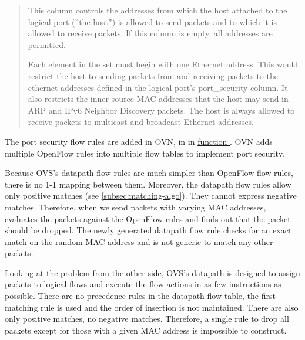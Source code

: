 \begin{quote}
    This column controls the addresses from which the host
    attached to the logical port (''the host'') is allowed to
    send packets and to which it is allowed to receive
    packets. If this column is empty, all addresses are
    permitted.

    Each element in the set must begin with one Ethernet
    address. This would restrict the host to sending packets
    from and receiving packets to the ethernet addresses
    defined in the logical port's port\_security column. It
    also restricts the inner source MAC addresses that the
    host may send in ARP and IPv6 Neighbor Discovery packets.
    The host is always allowed to receive packets to multicast
    and broadcast Ethernet addresses.
\end{quote}

The port security flow rules are added in OVN, in  in \href{https://github.com/ovn-org/ovn/blob/45bf9ed9dd2070a458bf384ce529e9ef62f26bd5/controller/lflow.c\#L3091-L3093}{function }. OVN adds multiple OpenFlow rules into multiple flow tables to implement port security.

Because OVS's datapath flow rules are much simpler than OpenFlow flow rules, there is no 1-1 mapping between them. Moreover, the datapath flow rules allow only positive matches (see \cref{subsec:matching-algo}). They cannot express negative matches. Therefore, when we send packets with varying MAC addresses,  evaluates the packets against the OpenFlow rules and finds out that the packet should be dropped. The newly generated datapath flow rule checks for an exact match on the random MAC address and is not generic to match any other packets.

Looking at the problem from the other side, OVS's datapath is designed to assign packets to logical flows and execute the flow actions in as few instructions as possible. There are no precedence rules in the datapath flow table, the first matching rule is used and the order of insertion is not maintained. There are also only positive matches, no negative matches. Therefore, a single rule to drop all packets except for those with a given MAC address is impossible to construct.




